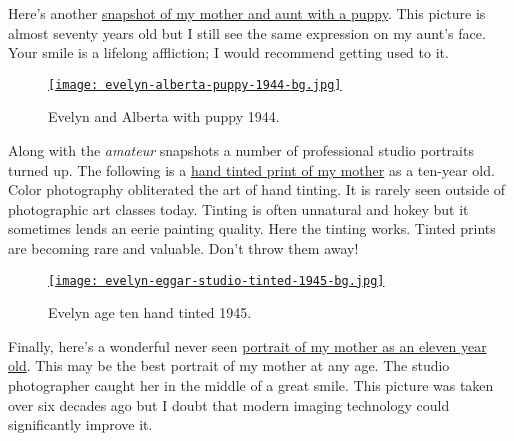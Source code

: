 Here's another \hyperlink{ht:4048X3}{snapshot of my mother and aunt with a puppy}. This picture
is almost seventy years old but I still see the same expression on my
aunt's face. Your smile is a lifelong affliction; I would recommend
getting used to it.


\begin{figure}[htbp]
\centering
\hypertarget{ht:4048X3}{}
\href{http://conceptcontrol.smugmug.com/People/From-Hazels-Albums-1/7104752\_FZK4j4\#!i=2525057933\&k=DsggvtX\&lb=1\&s=A}{\texttt{[image: evelyn-alberta-puppy-1944-bg.jpg]}}
\caption{Evelyn and Alberta with puppy 1944.}
\label{fig:4048X3}
\end{figure}

Along with the \emph{amateur} snapshots a number of professional studio
portraits turned up. The following is a \hyperlink{ht:4048X4}{hand tinted print of my mother}
as a ten-year old. Color photography obliterated the art of hand
tinting. It is rarely seen outside of photographic art classes today.
Tinting is often unnatural and hokey but it sometimes lends an eerie
painting quality. Here the tinting works. Tinted prints are becoming
rare and valuable. Don't throw them away!


\begin{figure}[htbp]
\centering
\hypertarget{ht:4048X4}{}
\href{http://conceptcontrol.smugmug.com/People/From-Hazels-Albums-1/7104752\_FZK4j4\#!i=2521568789\&k=sg9BR5f\&lb=1\&s=A}{\texttt{[image: evelyn-eggar-studio-tinted-1945-bg.jpg]}}
\caption{Evelyn age ten hand tinted 1945.}
\label{fig:4048X4}
\end{figure}

\newpage %

Finally, here's a wonderful never seen \hyperlink{ht:4048X5}{portrait of my mother as an
eleven year old}. This may be the best portrait of my mother at any age.
The studio photographer caught her in the middle of a great smile. This
picture was taken over six decades ago but I doubt that modern imaging
technology could significantly improve it.

